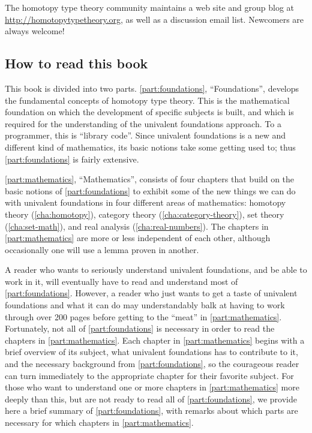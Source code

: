The homotopy type theory community maintains a web site and group blog at \url{http://homotopytypetheory.org}, as well as a discussion email list.
Newcomers are always welcome!


\subsection*{How to read this book}

This book is divided into two parts.
\cref{part:foundations}, ``Foundations'', develops the fundamental concepts of homotopy type theory.
This is the mathematical foundation on which the development of specific subjects is built, and which is required for the understanding of the univalent foundations approach. To a programmer, this is ``library code''.
Since univalent foundations is a new and different kind of mathematics, its basic notions take some getting used to; thus \cref{part:foundations} is fairly extensive.

\cref{part:mathematics}, ``Mathematics'', consists of four chapters that build on the basic notions of \cref{part:foundations} to exhibit some of the new things we can do with univalent foundations in four different areas of mathematics: homotopy theory (\cref{cha:homotopy}), category theory (\cref{cha:category-theory}), set theory (\cref{cha:set-math}), and real analysis (\cref{cha:real-numbers}).
The chapters in \cref{part:mathematics} are more or less independent of each other, although occasionally one will use a lemma proven in another.

A reader who wants to seriously understand univalent foundations, and be able to work in it, will eventually have to read and understand most of \cref{part:foundations}.
However, a reader who just wants to get a taste of univalent foundations and what it can do may understandably balk at having to work through over 200 pages before getting to the ``meat'' in \cref{part:mathematics}.
Fortunately, not all of \cref{part:foundations} is necessary in order to read the chapters in \cref{part:mathematics}.
Each chapter in \cref{part:mathematics} begins with a brief overview of its subject, what univalent foundations has to contribute to it, and the necessary background from \cref{part:foundations}, so the courageous reader can turn immediately to the appropriate chapter for their favorite subject.
For those who want to understand one or more chapters in \cref{part:mathematics} more deeply than this, but are not ready to read all of \cref{part:foundations}, we provide here a brief summary of \cref{part:foundations}, with remarks about which parts are necessary for which chapters in \cref{part:mathematics}.

